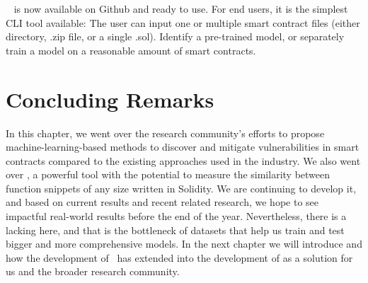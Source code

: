 \slithersimil~ is now available on Github and ready to use.
For end users, it is the simplest CLI tool available:
The user can input one or multiple smart contract files (either directory, .zip file, or a single .sol).
Identify a pre-trained model, or separately train a model on a reasonable amount of smart contracts.

\section{Concluding Remarks}

In this chapter, we went over the research community's efforts to propose machine-learning-based methods to discover and mitigate vulnerabilities in smart contracts compared to the existing approaches used in the industry.
We also went over \slithersimil, a powerful tool with the potential to measure the similarity between function snippets of any size written in Solidity.
We are continuing to develop it, and based on current results and recent related research, we hope to see impactful real-world results before the end of the year.
Nevertheless, there is a lacking here, and that is the bottleneck of datasets that help us train and test bigger and more comprehensive models.
In the next chapter we will introduce \etherbase and how the development of \slithersimil~has extended into the development of \etherbase as a solution for us and the broader research community.